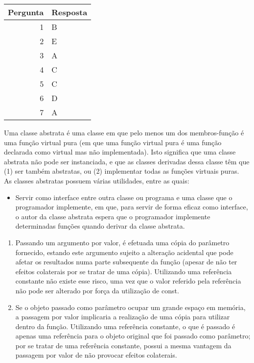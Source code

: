 \setcounter{chapter}{16}
\begin{center}
\begin{tabular}{r | l}
	Pergunta & Resposta \\ \hline
	1 & B \\
	2 & E \\
	3 & A \\
	4 & C \\
	5 & C \\
	6 & D \\
	7 & A
\end{tabular}
\end{center}
Uma classe abstrata é uma classe em que pelo menos um dos membros-função é uma função virtual pura (em que uma função virtual pura é uma função declarada como virtual mas não implementada). Isto significa que uma classe abstrata não pode ser instanciada, e que as classes derivadas dessa classe têm que (1) ser também abstratas, ou (2) implementar todas as funções virtuais puras.\\
As classes abstratas possuem várias utilidades, entre as quais:
\begin{itemize}
	\item Servir como interface entre outra classe ou programa e uma classe que o programador implemente, em que, para servir de forma eficaz como interface, o autor da classe abstrata espera que o programador implemente determinadas funções quando derivar da classe abstrata. 
\end{itemize}
\begin{enumerate}
	\item Passando um argumento por valor, é efetuada uma cópia do parâmetro fornecido, estando este argumento sujeito a alteração acidental que pode afetar os resultados numa parte subsequente da função (apesar de não ter efeitos colaterais por se tratar de uma cópia). Utilizando uma referência constante não existe esse risco, uma vez que o valor referido pela referência não pode ser alterado por força da utilização de const.
	\item Se o objeto passado como parâmetro ocupar um grande espaço em memória, a passagem por valor implicaria a realização de uma cópia para utilizar dentro da função. Utilizando uma referência constante, o que é passado é apenas uma referência para o objeto original que foi passado como parâmetro; por se tratar de uma referência constante, possui a mesma vantagem da passagem por valor de não provocar efeitos colaterais.
\end{enumerate}
